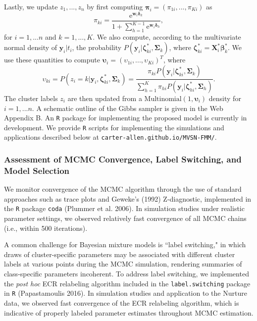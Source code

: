 \documentclass[useAMS,referee]{biom}
\begin{document}
Lastly, we update $z_1,...,z_n$ by first computing $\boldsymbol\pi_i = (\pi_{1i},...,\pi_{Ki})$ as
$$\pi_{ki} = \frac{\text{e}^{\mathbf{w}_i\boldsymbol\delta_k}}{1 + \sum_{h=1}^{K-1} \text{e}^{\mathbf{w}_i\boldsymbol\delta_h}},$$ 
for $i = 1,...n$ and $k = 1,...,K$. We also compute, according to the multivariate normal density of $\mathbf{y}_i|t_i$, the probability $P(\mathbf{y}_i|\boldsymbol\zeta^*_{ki},\boldsymbol\Sigma_k)$, where $\boldsymbol\zeta^*_{ki} = \mathbf{X}_i^*\boldsymbol\beta^*_k$. We use these quantities to compute $\boldsymbol\upsilon_{i} = (\upsilon_{1i},...,\upsilon_{Ki})^T$, where  
$$\upsilon_{ki} = P(z_i = k|\mathbf{y}_i,\boldsymbol\zeta^*_{ki},\boldsymbol\Sigma_k) = \frac{\pi_{ki}P(\mathbf{y}_i|\boldsymbol\zeta^*_{ki},\boldsymbol\Sigma_k)}{\sum_{h = 1}^{K} \pi_{hi}P(\mathbf{y}_i|\boldsymbol\zeta^*_{hi},\boldsymbol\Sigma_h)}.$$
The cluster labels $z_i$ are then updated from a $\text{Multinomial}(1,\boldsymbol\upsilon_i)$ density for $i = 1,...n$. A schematic outline of the Gibbs sampler is given in the Web Appendix B. An \texttt{R} package for implementing the proposed model is currently in development. We provide \texttt{R} scripts for implementing the simulations and applications described below at 
\texttt{carter-allen.github.io/MVSN-FMM/}.

\subsubsection{Assessment of MCMC Convergence, Label Switching, and Model Selection}
\label{s:mcmcmisc}

We monitor convergence of the MCMC algorithm through the use of standard approaches such as trace plots and Geweke's (1992) Z-diagnostic, implemented in the \texttt{R} package \texttt{coda} (Plummer et al. 2006). In simulation studies under realistic parameter settings, we observed relatively fast convergence of all MCMC chains (i.e., within 500 iterations).

A common challenge for Bayesian mixture models is ``label switching," in which draws of cluster-specific parameters may be associated with different cluster labels at various points during the MCMC simulation, rendering summaries of class-specific parameters incoherent. To address label switching, we implemented the \textit{post hoc} ECR relabeling algorithm included in the \texttt{label.switching} package in \texttt{R} (Papastamoulis 2016). In simulation studies and application to the Nurture data, we observed fast convergence of the ECR relabeling algorithm, which is indicative of properly labeled parameter estimates throughout MCMC estimation.
\end{document}
